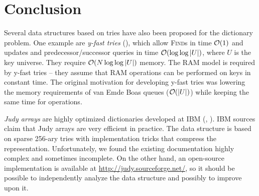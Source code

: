 \chapter*{Conclusion}

Several data structures based on tries have also been proposed for the
dictionary problem. One example are \emph{y-fast tries} (\cite{y-fast}),
which allow \textsc{Find}s in time $\mathcal{O}(1)$ and updates and predecessor/successor
queries in time $\mathcal{O}(\log\log |U|)$, where $U$ is the key universe. They require
$\mathcal{O}(N \log\log |U|)$ memory.
The RAM model is required by y-fast tries -- they assume that RAM operations
can be performed on keys in constant time.
The original motivation for developing y-fast tries was lowering the memory
requirements of van Emde Boas queues ($\mathcal{O}(|U|)$) while keeping the same time
for operations.

\emph{Judy arrays} are highly optimized dictionaries developed at IBM
(\cite{judy-shop-manual}, \cite{judy-patent}).
IBM sources claim that Judy arrays are very efficient in practice.
The data structure is based on sparse 256-ary tries with implementation tricks
that compress the representation.
Unfortunately, we found the existing documentation highly complex and sometimes
incomplete. On the other hand, an open-source implementation is available
at \url{http://judy.sourceforge.net/}, so it should be possible to independently
analyze the data structure and possibly to improve upon it.
